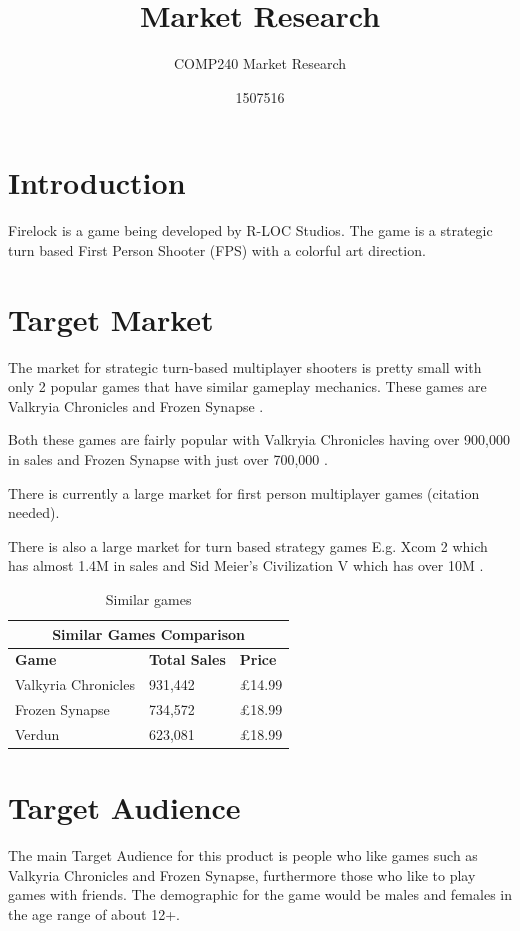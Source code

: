 \documentclass{scrartcl}
\title{Market Research}
\subtitle{COMP240 Market Research}
\author{1507516}
\begin{document}
\maketitle



\section{Introduction}
Firelock is a game being developed by R-LOC Studios. The game is a strategic turn based First Person Shooter (FPS) with a colorful art direction.


\section{Target Market}
The market for strategic turn-based multiplayer shooters is pretty small with only 2 popular games that have similar gameplay mechanics.
These games are Valkryia Chronicles and Frozen Synapse \cite{Valkyria, Frozen}.

 Both these games are fairly popular with Valkryia Chronicles having over 900,000\cite{Valkyria} in sales and Frozen Synapse with just over 700,000 \cite{Frozen}.
 
 There is currently a large market for first person multiplayer games (citation needed).

There is also a large market for turn based strategy games E.g. Xcom 2\cite{xcom} which has almost 1.4M in sales and Sid Meier's Civilization V which has over 10M \cite{civV}. 

\begin{table}
	\begin{tabular}{ |p{4cm}||p{3cm}|p{3cm}|  }
		 \hline
		 \multicolumn{3}{|c|}{\textbf{Similar Games Comparison}} \\
		 \hline
		 \textbf{Game} & \textbf{Total Sales} & \textbf{Price} \\
		 \hline
		 Valkyria Chronicles   & 931,442    &\pounds 14.99\\
		 Frozen Synapse  & 734,572  & \pounds 18.99  \\
		 Verdun  & 623,081  & \pounds 18.99  \\
		 \hline
	\end{tabular}
	\caption{Similar games}
	\label{table:similar}
\end{table}

\section{ Target Audience}
The main Target Audience for this product is people who like games such as Valkyria Chronicles and Frozen Synapse, furthermore those who like to play games with friends.
The demographic for the game would be males and females in the age range of about 12+.
\end{document}

